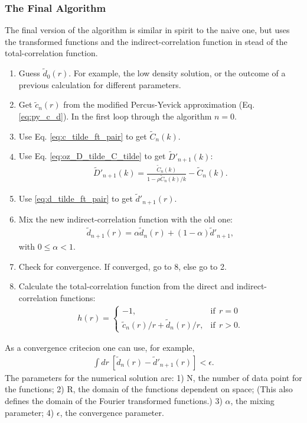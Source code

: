 \subsubsection{The Final Algorithm}
The final version of the algorithm is similar in spirit to the naive one, but uses the transformed functions and the indirect-correlation function in stead of the total-correlation function.
\begin{enumerate}
\item  Guess $\tilde{d}_0(r)$. For example, the low density solution, or the outcome of a previous calculation for different parameters.
\item Get $\tilde{c}_n(r)$ from the modified Percus-Yevick approximation (Eq. \eqref{eq:py_c_d}).
In the first loop through the algorithm $n=0$.
\item Use Eq. \eqref{eq:c_tilde_ft_pair} to get $\tilde{C}_n(k)$.
\item Use Eq. \eqref{eq:oz_D_tilde_C_tilde} to get $\tilde{D}'_{n+1}(k)$:
\begin{align}
\tilde{D}'_{n+1}(k) = \frac{\tilde{C}_n(k)}{1-\rho \tilde{C}_n(k)/k} - \tilde{C}_n(k).
\end{align}
\item Use \eqref{eq:d_tilde_ft_pair} to get $\tilde{d}'_{n+1}(r)$.
\item Mix the new indirect-correlation function with the old one:
\begin{align}
\tilde{d}_{n+1}(r) = \alpha \tilde{d}_n(r) + 
    (1-\alpha) \tilde{d}'_{n+1},
\end{align}
with $0 \leq \alpha < 1$.
\item Check for convergence. If converged, go to 8, else go to 2.
\item  Calculate the total-correlation function from the direct and indirect-correlation functions:
\begin{align}
h(r) = 
\begin{cases}
    -1 ,&\text{if}~~ r = 0\\
    \tilde{c}_n(r)/r + \tilde{d}_n(r)/r ,& \text{if}~~ r>0.
\end{cases}
\end{align}
\end{enumerate}
As a convergence critecion one can use, for example,
\begin{align}
\int dr~\left[ \tilde{d}_n(r) - \tilde{d}'_{n+1}(r) \right]
< \epsilon.
\end{align}
The parameters for the numerical solution are: 1) N, the number of data point for the functions;
2) R, the domain of the functions dependent on space;
(This also defines the domain of the Fourier transformed functions.)
3) $\alpha$, the mixing parameter;
4) $\epsilon$, the convergence parameter.
